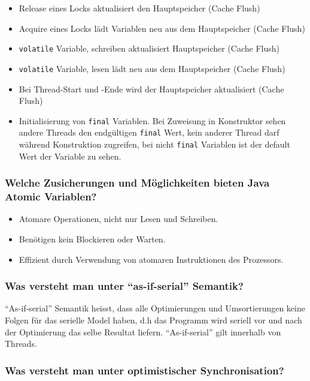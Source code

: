 \documentclass[10pt,a4paper]{scrartcl}
\begin{document}
\begin{itemize}
	\item Release eines Locks aktualisiert den Hauptspeicher (Cache Flush)
	\item Acquire eines Locks lädt Variablen neu aus dem Hauptspeicher (Cache Flush)
	\item \texttt{volatile} Variable, schreiben aktualisiert Hauptspeicher (Cache Flush)
	\item \texttt{volatile} Variable, lesen lädt neu aus dem Hauptspeicher (Cache Flush)
	\item Bei Thread-Start und -Ende wird der Hauptspeicher aktualisiert (Cache Flush)
	\item Initialisierung von \texttt{final} Variablen. Bei Zuweisung in Konstruktor sehen andere
		Threads den endgültigen \texttt{final} Wert, kein anderer Thread darf während Konstruktion
		zugreifen, bei nicht \texttt{final} Variablen ist der default Wert der Variable zu sehen.
\end{itemize}
  
\subsubsection{Welche Zusicherungen und Möglichkeiten bieten Java Atomic Variablen?}

\begin{itemize}
	\item Atomare Operationen, nicht nur Lesen und Schreiben.
	\item Benötigen kein Blockieren oder Warten.
	\item Effizient durch Verwendung von atomaren Instruktionen des Prozessors.
\end{itemize}
  
\subsubsection{Was versteht man unter "`as-if-serial"' Semantik?}

"`As-if-serial"' Semantik heisst, dass alle Optimierungen und Umsortierungen keine Folgen für das
serielle Model haben, d.h das Programm wird seriell vor und nach der Optimierung das selbe Resultat
liefern. "`As-if-serial"' gilt innerhalb von Threads. 
  
\subsubsection{Was versteht man unter optimistischer Synchronisation?}
\end{document}
